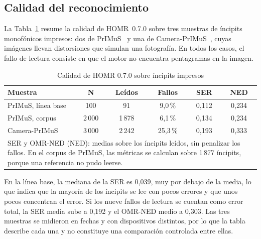\documentclass[conference]{IEEEtran}
\begin{document}
\subsection{Calidad del reconocimiento}

La Tabla~\ref{tab:calidad-omr} resume la calidad de HOMR~0.7.0 sobre tres
muestras de íncipits monofónicos impresos: dos de
PrIMuS~\cite{calvo2018} y una de Camera-PrIMuS~\cite{cameraprimus2018},
cuyas imágenes llevan distorsiones que simulan una fotografía. En todos
los casos, el fallo de lectura consiste en que el motor no encuentra
pentagramas en la imagen.

\begin{table}[htbp]
\caption{Calidad de HOMR 0.7.0 sobre íncipits impresos}
\label{tab:calidad-omr}
\centering
\footnotesize
\setlength{\tabcolsep}{3pt}
\begin{tabular}{|p{2.35cm}|c|c|c|c|c|}
\hline
\textbf{Muestra} & \textbf{N} & \textbf{Leídos} & \textbf{Fallos} & \textbf{SER} & \textbf{NED} \\
\hline
PrIMuS, línea base & 100 & 91 & 9,0\,\% & 0,112 & 0,234 \\
\hline
PrIMuS, corpus & 2\,000 & 1\,878 & 6,1\,\% & 0,134 & 0,234 \\
\hline
Camera-PrIMuS & 3\,000 & 2\,242 & 25,3\,\% & 0,193 & 0,333 \\
\hline
\multicolumn{6}{|p{7.6cm}|}{\scriptsize SER y OMR-NED (NED): medias sobre los íncipits leídos, sin penalizar los fallos. En el corpus de PrIMuS, las métricas se calculan sobre 1\,877 íncipits, porque una referencia no pudo leerse.} \\
\hline
\end{tabular}
\end{table}

En la línea base, la mediana de la SER es 0,039, muy por debajo de la
media, lo que indica que la mayoría de los íncipits se lee con pocos
errores y que unos pocos concentran el error. Si los nueve fallos de
lectura se cuentan como error total, la SER media sube a 0,192 y el
OMR-NED medio a 0,303.
Las tres muestras se midieron en fechas y con dispositivos distintos, por
lo que la tabla describe cada una y no constituye una comparación
controlada entre ellas.
\end{document}
